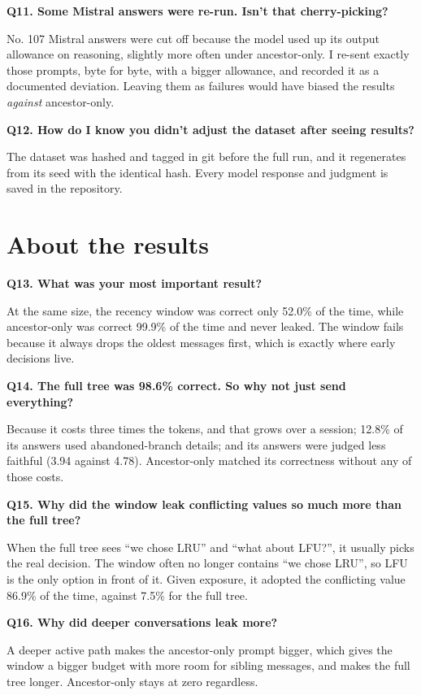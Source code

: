 \textbf{Q11. Some Mistral answers were re-run. Isn't that cherry-picking?}\par
No. 107 Mistral answers were cut off because the model used up its output allowance on reasoning, slightly more often under ancestor-only. I re-sent exactly those prompts, byte for byte, with a bigger allowance, and recorded it as a documented deviation. Leaving them as failures would have biased the results \emph{against} ancestor-only.

\textbf{Q12. How do I know you didn't adjust the dataset after seeing results?}\par
The dataset was hashed and tagged in git before the full run, and it regenerates from its seed with the identical hash. Every model response and judgment is saved in the repository.

\section*{About the results}

\textbf{Q13. What was your most important result?}\par
At the same size, the recency window was correct only 52.0\% of the time, while ancestor-only was correct 99.9\% of the time and never leaked. The window fails because it always drops the oldest messages first, which is exactly where early decisions live.

\textbf{Q14. The full tree was 98.6\% correct. So why not just send everything?}\par
Because it costs three times the tokens, and that grows over a session; 12.8\% of its answers used abandoned-branch details; and its answers were judged less faithful (3.94 against 4.78). Ancestor-only matched its correctness without any of those costs.

\textbf{Q15. Why did the window leak conflicting values so much more than the full tree?}\par
When the full tree sees ``we chose LRU'' and ``what about LFU?'', it usually picks the real decision. The window often no longer contains ``we chose LRU'', so LFU is the only option in front of it. Given exposure, it adopted the conflicting value 86.9\% of the time, against 7.5\% for the full tree.

\textbf{Q16. Why did deeper conversations leak more?}\par
A deeper active path makes the ancestor-only prompt bigger, which gives the window a bigger budget with more room for sibling messages, and makes the full tree longer. Ancestor-only stays at zero regardless.

